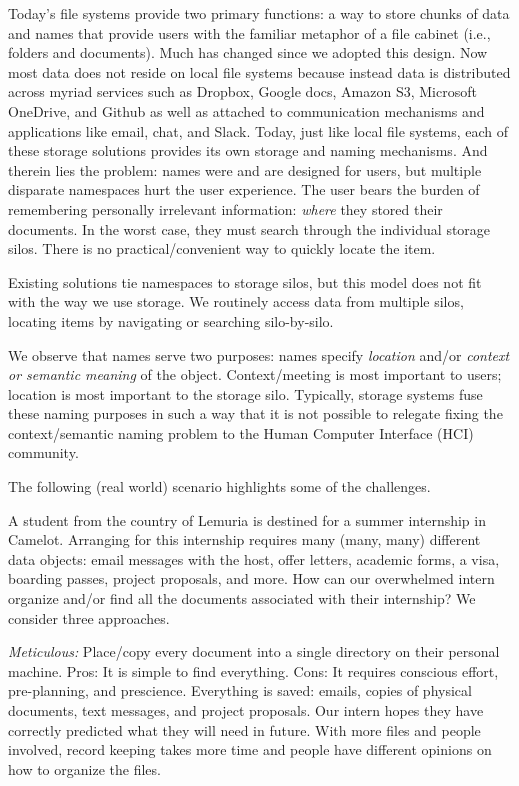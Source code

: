 Today's file systems provide two primary functions: a way to store chunks of data and names that provide users with the familiar
metaphor of a file cabinet (i.e., folders and documents).
Much has changed since we adopted this design.
Now most data does not reside on local file systems because instead data is distributed across myriad services such as Dropbox, Google docs, Amazon S3, Microsoft OneDrive, and Github as well as attached to communication mechanisms and applications like email, chat, and Slack.
Today, just like local file systems, each of these storage solutions provides its own storage and naming mechanisms.
And therein lies the problem: names were and are designed for users, but multiple disparate namespaces hurt the user experience.
The user bears the burden of remembering personally irrelevant information: \textit{where} they stored their documents.
In the worst case, they must search through the individual storage silos. There is no practical/convenient way to quickly locate the item.

Existing solutions tie namespaces to storage silos, but this model does not fit with the way we use storage.
We routinely access data from multiple silos, locating items by navigating or searching silo-by-silo.

We observe that names serve two purposes: names specify \textit{location} and/or \textit{context or semantic meaning} of the object.
Context/meeting is most important to users; location is most important to the storage silo.
Typically, storage systems fuse these naming purposes in such a way that it is not possible to relegate
fixing the context/semantic naming problem to the Human Computer Interface (HCI) community.

The following (real world) scenario highlights some of the challenges.

A student from the country of Lemuria is destined for a summer internship in Camelot. Arranging for this internship
requires many (many, many) different data objects: email messages with the host, offer letters, academic forms, a visa,
boarding passes, project proposals, and more. How can our overwhelmed intern organize and/or find all the documents
associated with their internship? We consider three approaches.

\textit{Meticulous:} Place/copy every document into a single directory on their personal machine.
Pros: It is simple to find everything.
Cons: It requires conscious effort, pre-planning, and prescience.  Everything is saved: emails,
copies of physical documents, text messages, and project proposals. Our intern hopes they have correctly predicted what they will
need in future.  With more files and people involved, record keeping takes more time and people have different opinions on how to organize the files.

